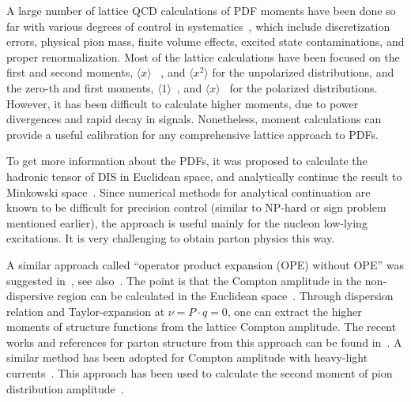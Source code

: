 A large number of lattice QCD calculations of PDF moments have been done
so far with various degrees of control in systematics~\cite{Lin:2017snn},
which include discretization errors,
physical pion mass, finite volume effects, excited state contaminations,
and proper renormalization. Most of the lattice calculations
have been focused on the first and second moments, $\langle x\rangle$
~\cite{Green:2012ud,Alexandrou:2017oeh,Bali:2014gha},
and $\langle x^2\rangle$\cite{Dolgov:2002zm,Deka:2008xr} for the unpolarized distributions,
and the zero-th and first moments, $\langle 1\rangle$~\cite{Gong:2015iir,Alexandrou:2017oeh,Chang:2018uxx,Alexandrou:2019brg},
and $\langle x\rangle$~\cite{Aoki:2010xg,Abdel-Rehim:2015owa} for the polarized distributions.
However, it has been difficult to
calculate higher moments, due to power divergences
and rapid decay in signals. Nonetheless, moment calculations can provide a useful
calibration for any comprehensive lattice approach to PDFs.

To get more information about the PDFs, it was proposed to
calculate the hadronic tensor of DIS in Euclidean space, and analytically continue the result
to Minkowski space~\cite{Liu:1993cv,Liu:1998um,
	Liu:1999ak,Liu:2016djw,Liu:2017lpe,Liu:2020okp}. Since numerical methods for
analytical continuation are known to be difficult for precision control (similar to NP-hard
or sign problem mentioned earlier), the approach
is useful mainly for the nucleon low-lying excitations. It is very challenging
to obtain parton physics this way.

A similar approach called ``operator product expansion (OPE) without OPE'' was suggested in~\cite{Aglietti:1998ur,Martinelli:1998hz}, see also~\cite{Dawson:1997ic,Capitani:1998fe,Capitani:1999fm}.
The point is that the Compton amplitude in the non-dispersive region
can be calculated in the Euclidean space~\cite{Ji:2001wha}. Through dispersion
relation and Taylor-expansion at $\nu = P\cdot q=0$, one can extract
the higher moments of structure functions from the lattice Compton amplitude.
The recent works and references for parton structure from this approach can be found in~\cite{Chambers:2017dov,Hannaford-Gunn:2020pvu,Horsley:2020ltc}.
A similar method has been adopted for Compton amplitude with heavy-light
currents~\cite{Detmold:2005gg}.
This approach has been used to calculate the second moment of pion distribution amplitude~\cite{Detmold:2018kwu,Detmold:2020lev}.

